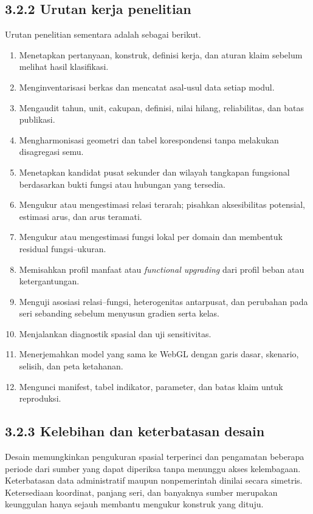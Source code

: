\documentclass[
  indonesian,
  11pt,
  a4paper,
  oneside,
  openany]{report}
\providecommand{\tightlist}{%
  \setlength{\itemsep}{0pt}\setlength{\parskip}{0pt}}
\begin{document}
\subsection{3.2.2 Urutan kerja
penelitian}\label{urutan-kerja-penelitian}

Urutan penelitian sementara adalah sebagai berikut.

\begin{enumerate}
\def\labelenumi{\arabic{enumi}.}
\tightlist
\item
  Menetapkan pertanyaan, konstruk, definisi kerja, dan aturan klaim
  sebelum melihat hasil klasifikasi.
\item
  Menginventarisasi berkas dan mencatat asal-usul data setiap modul.
\item
  Mengaudit tahun, unit, cakupan, definisi, nilai hilang, reliabilitas,
  dan batas publikasi.
\item
  Mengharmonisasi geometri dan tabel korespondensi tanpa melakukan
  disagregasi semu.
\item
  Menetapkan kandidat pusat sekunder dan wilayah tangkapan fungsional
  berdasarkan bukti fungsi atau hubungan yang tersedia.
\item
  Mengukur atau mengestimasi relasi terarah; pisahkan aksesibilitas
  potensial, estimasi arus, dan arus teramati.
\item
  Mengukur atau mengestimasi fungsi lokal per domain dan membentuk
  residual fungsi--ukuran.
\item
  Memisahkan profil manfaat atau \emph{functional upgrading} dari profil
  beban atau ketergantungan.
\item
  Menguji asosiasi relasi--fungsi, heterogenitas antarpusat, dan
  perubahan pada seri sebanding sebelum menyusun gradien serta kelas.
\item
  Menjalankan diagnostik spasial dan uji sensitivitas.
\item
  Menerjemahkan model yang sama ke WebGL dengan garis dasar, skenario,
  selisih, dan peta ketahanan.
\item
  Mengunci manifest, tabel indikator, parameter, dan batas klaim untuk
  reproduksi.
\end{enumerate}

\subsection{3.2.3 Kelebihan dan keterbatasan
desain}\label{kelebihan-dan-keterbatasan-desain}

Desain memungkinkan pengukuran spasial terperinci dan pengamatan
beberapa periode dari sumber yang dapat diperiksa tanpa menunggu akses
kelembagaan. Keterbatasan data administratif maupun nonpemerintah
dinilai secara simetris. Ketersediaan koordinat, panjang seri, dan
banyaknya sumber merupakan keunggulan hanya sejauh membantu mengukur
konstruk yang dituju.
\end{document}
